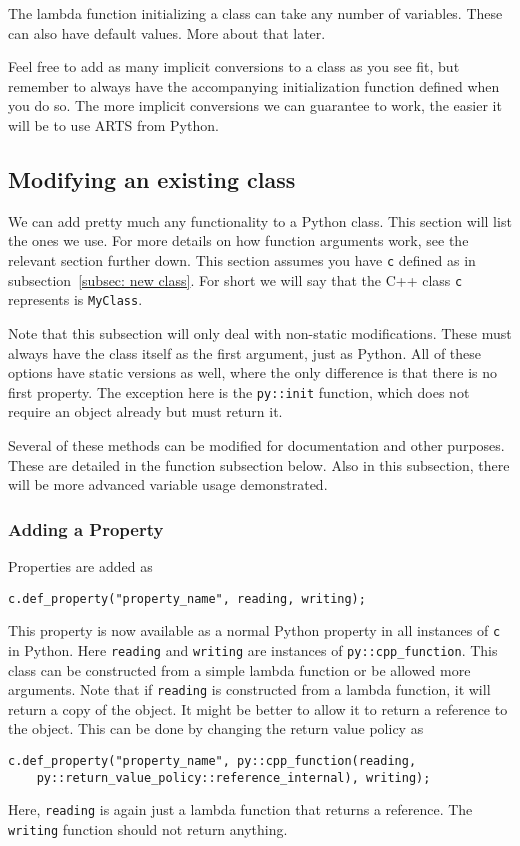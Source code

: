 The lambda function initializing a class can take any number of variables. These can also have default values.  More about that later.

Feel free to add as many implicit conversions to a class as you see fit, but remember to always have the accompanying
initialization function defined when you do so.  The more implicit conversions we can guarantee to work, the easier it
will be to use ARTS from Python.

\subsection{Modifying an existing class}
We can add pretty much any functionality to a Python class.  This section will list the ones we use.
For more details on how function arguments work, see the relevant section further down.
This section assumes you have \texttt{c} defined as in subsection~\ref{subsec: new class}.  For short
we will say that the C++ class \texttt{c} represents is \texttt{MyClass}.

Note that this subsection will only deal with non-static modifications.  These must always have
the class itself as the first argument, just as Python.  All of these options have static
versions as well, where the only difference is that there is no first property.  The exception here
is the \texttt{py::init} function, which does not require an object already but must return it.

Several of these methods can be modified for documentation and other purposes.
These are detailed in the function subsection below.  Also in this subsection,
there will be more advanced variable usage demonstrated.

\subsubsection{Adding a Property}
Properties are added as
\begin{verbatim}
c.def_property("property_name", reading, writing);
\end{verbatim}
This property is now available as a normal Python property in all instances of \texttt{c} in Python.
Here \texttt{reading} and \texttt{writing} are instances of \texttt{py::cpp_function}.  This class
can be constructed from a simple lambda function or be allowed more arguments.  Note that if \texttt{reading}
is constructed from a lambda function, it will return a copy of the object.  It might be better to allow it to return
a reference to the object.  This can be done  by changing the return value policy as
\begin{verbatim}
c.def_property("property_name", py::cpp_function(reading, 
    py::return_value_policy::reference_internal), writing);
\end{verbatim}
Here, \texttt{reading} is again just a lambda function that returns a reference. The 
\texttt{writing} function should not return anything.

